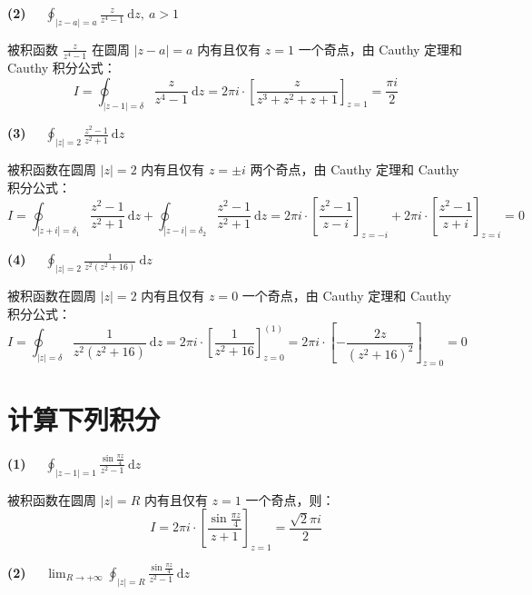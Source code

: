 \documentclass[UTF8]{report}
\theoremstyle{MyLineTheoremStyle} %
\theoremstyle{MyBlockTheoremStyle} %
\theoremstyle{MySubsubsectionStyle} %
\begin{document}
\textbf{(2)\ \ } $\displaystyle \oint_{| z -a | = a} \frac{ z}{z^4 - 1} \ \mathrm{d} z,\ a > 1$

被积函数 $\frac{z}{z^4 - 1}$ 在圆周 $| z - a | = a$ 内有且仅有 $z = 1$ 一个奇点，由 Cauthy 定理和 Cauthy 积分公式：
\begin{equation*}
I = \oint_{| z - 1 | = \delta } \frac{z}{z^4 - 1} \ \mathrm{d}z = 2 \pi i \cdot \left[ \frac{z}{z^3 + z^2 +z +1} \right]_{z = 1} = \frac{\pi i }{2}
\end{equation*}

\textbf{(3)\ \ } $\displaystyle \oint_{| z | = 2} \frac{z^2 - 1}{z^2 + 1} \ \mathrm{d} z$

被积函数在圆周 $| z | =2$ 内有且仅有 $z = \pm i$ 两个奇点，由 Cauthy 定理和 Cauthy 积分公式：
\begin{equation*}
    I = \oint_{| z  + i| = \delta_1} \frac{z^2 - 1}{z^2 + 1} \ \mathrm{d} z + \oint_{| z  - i | = \delta_2} \frac{z^2 - 1}{z^2 + 1} \ \mathrm{d} z =  2 \pi i \cdot \left[ \frac{z^2 - 1}{z - i} \right]_{z = -i} + 2 \pi i \cdot \left[ \frac{z^2 - 1}{z + i} \right]_{z = i} 
    = 0
\end{equation*}

\textbf{(4)\ \ } $\displaystyle \oint_{| z | = 2} \frac{1}{z^2(z^2 + 16)} \ \mathrm{d} z$

被积函数在圆周 $| z | =2$ 内有且仅有 $z = 0$ 一个奇点，由 Cauthy 定理和 Cauthy 积分公式：
\begin{equation*}
    I 
    = \oint_{| z | = \delta} \frac{1}{z^2(z^2 + 16)} \ \mathrm{d} z 
    = 2 \pi i \cdot \left[ \frac{1}{z^2 + 16} \right]^{(1)}_{z = 0} 
    = 2 \pi i \cdot \left[ -\frac{2z}{(z^2 + 16)^2} \right]_{z = 0} 
    = 0
\end{equation*}

\section{计算下列积分}

\textbf{(1)\ \ }  $\displaystyle \oint_{| z - 1 | = 1 } \frac{\sin \frac{\pi z}{4}}{z^2 - 1}  \ \mathrm{d} z$

被积函数在圆周 $| z | = R$ 内有且仅有 $z = 1$ 一个奇点，则：
\begin{equation*}
I 
=  2 \pi i \cdot \left[ \frac{\sin \frac{\pi z}{4}}{z + 1}  \right]_{z = 1} = \frac{\sqrt{2} \pi i }{2}
\end{equation*}

\textbf{(2)\ \ } $\displaystyle \lim_{R \to +\infty}\oint_{| z | = R } \frac{\sin \frac{\pi z}{4}}{z^2 - 1}  \ \mathrm{d} z$
\end{document}
